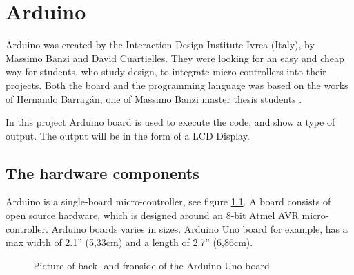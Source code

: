\chapter{Arduino}\label{analysis:arduino}
Arduino was created by the Interaction Design Institute Ivrea (Italy), by Massimo Banzi and David Cuartielles. They were looking for an easy and cheap way for students, who study design, to integrate micro controllers into their projects\cite{arduino:hist}. Both the board and the programming language was based on the works of Hernando Barragán, one of Massimo Banzi master thesis students \cite{Wiring:thesis}.

In this project Arduino board is used to execute the code, and show a type of output. The output will be in the form of a LCD Display. 

\section{The hardware components}
Arduino is a single-board micro-controller, see figure \ref{fig:Arduino_uno}.
A board consists of open source hardware, which is designed around an 8-bit Atmel AVR micro-controller. Arduino boards varies in sizes. Arduino Uno board for example, has a max width of 2.1'' (5,33cm) and a length of 2.7'' (6,86cm).  \\

\par
{}
\hfill
{}
\begin{figure}[H]
\caption{Picture of back- and fronside of the Arduino Uno board \cite{Arduino:board_pics}}
\label{fig:Arduino_uno}
\end{figure}
\par

